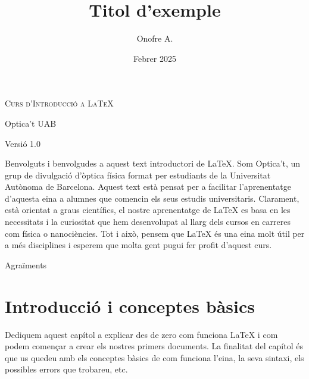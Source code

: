 \documentclass[12pm,twosides,onecolumn,openany]{book}
\title{Titol d'exemple}
\author{Onofre A.}
\date{Febrer 2025}
\begin{document}
\newpage
\thispagestyle{empty}
\begin{titlepage}
    \centering
    \vspace*{\fill}  
    {\Huge \textsc{Curs d'Introducció a \LaTeX{}} \par}
    \vspace{1cm}
    {\Large Optica't UAB \par}
    \vspace{0.5cm}
    {\large Versió 1.0 \par}
    \vspace{5cm}
    \vspace*{\fill} 
\end{titlepage}


\newpage

\thispagestyle{empty}
Benvolguts i benvolgudes a aquest text introductori de LaTeX. Som Optica't, un grup de divulgació d'òptica física format per estudiants de la Universitat Autònoma de Barcelona. Aquest text està pensat per a facilitar l'aprenentatge d'aquesta eina a alumnes que comencin els seus estudis universitaris. Clarament, està orientat a graus científics, el nostre aprenentatge de LaTeX es basa en les necessitats i la curiositat que hem desenvolupat al llarg dels cursos en carreres com física o nanociències. Tot i això, pensem que LaTeX és una eina molt útil per a més disciplines i esperem que molta gent pugui fer profit d'aquest curs.

\newpage
\tableofcontents
\pagestyle{empty}
\newpage
Agraïments
\newpage
\pagestyle{fancy}
\chapter{Introducció i conceptes bàsics}
\thispagestyle{empty}

Dediquem aquest capítol a explicar des de zero com funciona LaTeX i com podem començar a crear els nostres primers documents. La finalitat del capítol és que us quedeu amb els conceptes bàsics de com funciona l'eina, la seva sintaxi, els possibles errors que trobareu, etc.
\end{document}

